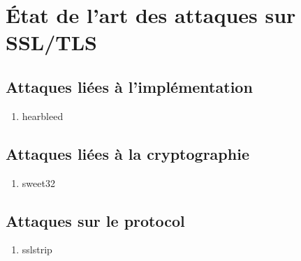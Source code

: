 \chapter{État de l'art des attaques sur SSL/TLS}

\section{Attaques liées à l'implémentation}

\begin{enumerate}
\item hearbleed
\end{enumerate}

\section{Attaques liées à la cryptographie}

\begin{enumerate}
\item sweet32
\end{enumerate}

\section{Attaques sur le protocol}

\begin{enumerate}
\item sslstrip
\end{enumerate}
